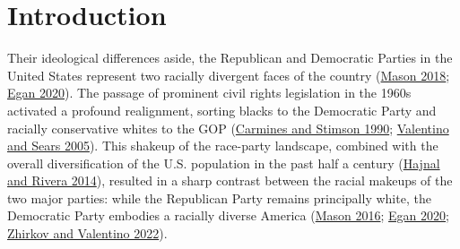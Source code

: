 \documentclass[
  12pt,
]{article}
\begin{document}
\ifdefined\Shaded\renewenvironment{Shaded}{\begin{tcolorbox}[boxrule=0pt, enhanced, borderline west={3pt}{0pt}{shadecolor}, interior hidden, frame hidden, breakable, sharp corners]}{\end{tcolorbox}}\fi

\hypertarget{introduction}{%
\section{Introduction}\label{introduction}}

Their ideological differences aside, the Republican and Democratic
Parties in the United States represent two racially divergent faces of
the country (\protect\hyperlink{ref-mason2018}{Mason 2018};
\protect\hyperlink{ref-egan2020}{Egan 2020}). The passage of prominent
civil rights legislation in the 1960s activated a profound realignment,
sorting blacks to the Democratic Party and racially conservative whites
to the GOP (\protect\hyperlink{ref-carmines1990}{Carmines and Stimson
1990}; \protect\hyperlink{ref-valentino2005}{Valentino and Sears 2005}).
This shakeup of the race-party landscape, combined with the overall
diversification of the U.S. population in the past half a century
(\protect\hyperlink{ref-hajnal2014}{Hajnal and Rivera 2014}), resulted
in a sharp contrast between the racial makeups of the two major parties:
while the Republican Party remains principally white, the Democratic
Party embodies a racially diverse America
(\protect\hyperlink{ref-mason2016}{Mason 2016};
\protect\hyperlink{ref-egan2020}{Egan 2020};
\protect\hyperlink{ref-zhirkov2022}{Zhirkov and Valentino 2022}).
\end{document}
